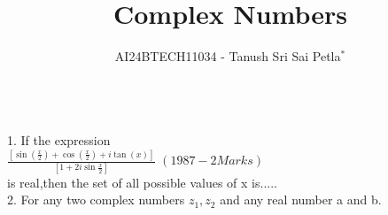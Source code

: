 \documentclass[journal,12pt,twocolumn]{IEEEtran}
\theoremstyle{remark}
\begin{document}

\vspace{3cm}

\title{Complex Numbers}
\author{AI24BTECH11034 - Tanush Sri Sai Petla$^{*}$%
}

\\
1. If the expression    \\        

$\frac{[\sin(\frac{x}{2}) + \cos(\frac{x}{2}) + i\tan(x)]}{[1+2i\sin\frac{x}{2}]}   $  \hfill$(1987 - 2 Marks)$\\
is real,then the set of all possible values of x is.....\\
2.  For any two complex numbers $z_1,z_2$ and any real number a and b.
\end{document}
